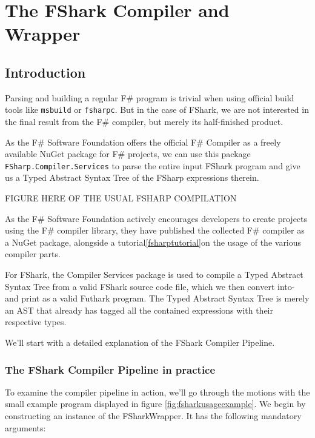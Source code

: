 \chapter{The FShark Compiler and Wrapper}
\section*{Introduction}
\label{sec:fsharkcompiler}
Parsing and building a regular F\# program is trivial when using official build tools like
\texttt{msbuild} or \texttt{fsharpc}.
But in the case of FShark, we are not interested in the final result from the
F\# compiler, but merely its half-finished product.

As the F\# Software Foundation offers the official F\# Compiler as a freely
available NuGet package for F\# projects, we can use this package
\texttt{FSharp.Compiler.Services} to parse the entire input FShark program and
give us a Typed Abstract Syntax Tree of the FSharp expressions therein.

FIGURE HERE OF THE USUAL FSHARP COMPILATION 

As the F\# Software Foundation actively encourages developers to create projects
using the F\# compiler library, they have published the collected F\# compiler
as a NuGet package, alongside a tutorial\ref{fsharptutorial}on the usage of the
various compiler parts.

For FShark, the Compiler Services package is used to compile a Typed Abstract
Syntax Tree from a valid FShark source code file, which we then
convert into- and print as a valid Futhark program.
The Typed Abstract Syntax Tree is merely an AST that already has tagged all the
contained expressions with their respective types.

We'll start with a detailed explanation of the FShark Compiler Pipeline.

\subsection{The FShark Compiler Pipeline in practice}
To examine the compiler pipeline in action, we'll go through the motions with
the small example program displayed in figure \ref{fig:fsharkusageexample}.
We begin by constructing an instance of the FSharkWrapper. It has the following
mandatory arguments:

